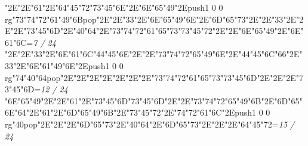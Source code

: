 \null\vfill\quad\quad\quad\ipa\char"2E\quad\quad\quad\quad\ipa\char"2E\ipa\char"61\ipa\char"2E\ipa\char"64\ipa\char"45\ipa\char"72\bigskip\ipa\char"73\ipa\char"45\ipa\char"6E\ipa\char"2E\ipa\char"6E\ipa\char"65\ipa\char"49\ipa\char"2E\pdfcolorstack\match push{1 0 0 rg}\ipa\char"73\ipa\char"74\ipa\char"72\ipa\char"61\ipa\char"49\ipa\char"6B\pdfcolorstack\match pop{}\bigskip\quad\quad\ipa\char"2E\quad\quad\quad\quad\ipa\char"2E\ipa\char"33\ipa\char"2E\ipa\char"6E\ipa\char"65\ipa\char"49\ipa\char"6E\ipa\char"2E\ipa\char"6D\ipa\char"65\ipa\char"73\ipa\char"2E\quad\quad\quad\quad\ipa\char"2E\quad\quad\quad\bigskip\ipa\char"33\ipa\char"2E\quad\quad\quad\quad\ipa\char"2E\quad\quad\ipa\char"2E\ipa\char"73\ipa\char"45\ipa\char"6D\ipa\char"2E\ipa\char"40\ipa\char"64\ipa\char"2E\ipa\char"73\ipa\char"74\ipa\char"72\ipa\char"61\ipa\char"65\ipa\char"73\bigskip\ipa\char"73\ipa\char"45\ipa\char"72\ipa\char"2E\quad\quad\ipa\char"2E\ipa\char"6E\ipa\char"65\ipa\char"49\ipa\char"2E\ipa\char"6E\ipa\char"61\ipa\char"6C\bigskip\vfill\footline={\hfill\tenrm\it 7 / 24}\eject
\null\vfill\quad\quad\quad\ipa\char"2E\quad\quad\quad\quad\ipa\char"2E\ipa\char"33\ipa\char"2E\ipa\char"6E\ipa\char"61\ipa\char"6C\bigskip\ipa\char"44\ipa\char"45\ipa\char"6E\ipa\char"2E\quad\quad\quad\ipa\char"2E\ipa\char"73\ipa\char"74\ipa\char"72\ipa\char"65\ipa\char"49\ipa\char"6E\bigskip\quad\quad\ipa\char"2E\ipa\char"44\ipa\char"45\ipa\char"6C\ipa\char"66\ipa\char"2E\ipa\char"33\ipa\char"2E\ipa\char"6E\ipa\char"61\ipa\char"49\ipa\char"6E\ipa\char"2E\pdfcolorstack\match push{1 0 0 rg}\ipa\char"74\ipa\char"40\ipa\char"64\pdfcolorstack\match pop{}\ipa\char"2E\quad\quad\quad\quad\ipa\char"2E\quad\quad\quad\bigskip\quad\ipa\char"2E\quad\quad\quad\quad\ipa\char"2E\quad\quad\ipa\char"2E\quad\quad\quad\ipa\char"2E\quad\quad\ipa\char"2E\ipa\char"73\ipa\char"74\ipa\char"72\ipa\char"61\ipa\char"65\ipa\char"73\bigskip\ipa\char"73\ipa\char"45\ipa\char"6D\ipa\char"2E\quad\quad\ipa\char"2E\quad\quad\quad\ipa\char"2E\ipa\char"73\ipa\char"45\ipa\char"6D\bigskip\vfill\footline={\hfill\tenrm\it 12 / 24}\eject
\null\vfill\ipa\char"6E\ipa\char"65\ipa\char"49\ipa\char"2E\quad\quad\quad\quad\ipa\char"2E\ipa\char"61\ipa\char"2E\ipa\char"73\ipa\char"45\ipa\char"6D\bigskip\ipa\char"73\ipa\char"45\ipa\char"6D\ipa\char"2E\quad\quad\quad\ipa\char"2E\ipa\char"73\ipa\char"74\ipa\char"72\ipa\char"65\ipa\char"49\ipa\char"6B\bigskip\quad\quad\ipa\char"2E\ipa\char"6D\ipa\char"65\ipa\char"6E\ipa\char"64\ipa\char"2E\ipa\char"61\ipa\char"2E\ipa\char"6D\ipa\char"65\ipa\char"49\ipa\char"6B\ipa\char"2E\ipa\char"73\ipa\char"45\ipa\char"72\ipa\char"2E\ipa\char"74\ipa\char"72\ipa\char"61\ipa\char"6C\ipa\char"2E\quad\quad\quad\bigskip\pdfcolorstack\match push{1 0 0 rg}\ipa\char"40\pdfcolorstack\match pop{}\ipa\char"2E\quad\quad\quad\quad\ipa\char"2E\quad\quad\ipa\char"2E\ipa\char"6D\ipa\char"65\ipa\char"73\ipa\char"2E\ipa\char"40\ipa\char"64\ipa\char"2E\quad\quad\quad\quad\quad\quad\bigskip\ipa\char"6D\ipa\char"65\ipa\char"73\ipa\char"2E\quad\quad\ipa\char"2E\quad\quad\quad\ipa\char"2E\ipa\char"64\ipa\char"45\ipa\char"72\bigskip\vfill\footline={\hfill\tenrm\it 15 / 24}\eject
